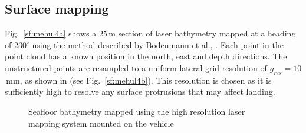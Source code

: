 \subsection{Surface mapping}
\label{sub:mapping}

 Fig.~\ref{sf:mehul4a} shows a $25$\,m section of laser bathymetry mapped at a heading of $230^\circ$ using the method described by Bodenmann et al.,  \cite{Bodenmann2016}. Each point in the point cloud 
has a known position in the north, east and depth directions. The unstructured points are resampled to a uniform lateral grid resolution of $g_{res}=10$\,mm, as shown in (see Fig.~\ref{sf:mehul4b}). This resolution is chosen as it is sufficiently high to resolve any surface protrusions that may affect landing.

\begin{figure}[!ht]
\centering
{}\quad
{}
\caption{Seafloor bathymetry mapped using the high resolution laser mapping system mounted on the vehicle\label{sf:mehul4}}
\end{figure}


